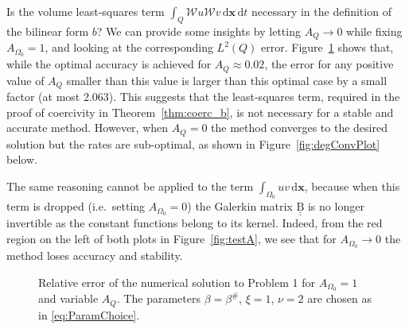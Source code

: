 \documentclass[a4paper]{article}
\theoremstyle{plain}
\theoremstyle{definition}
\newcommand{\operator}[1]{\mathcal{#1}}
\newcommand{\dx}{{\,\mathrm{d}\vect x}}
\newcommand{\dt}{{\,\mathrm{d}t}}
\newcommand{\vect}[1]{\bm{#1}}
\newcommand{\mat}[1]{\underline{\underline{\mathrm{#1}}}}
\newcommand{\oW}{{\operator{W}}}
\newcommand{\OZ}{{\Omega_0}}
\begin{document}
Is the volume least-squares term $\int_Q \oW u \oW v\dx\dt$ necessary in the definition of the bilinear form $b$?
We can provide some insights by letting $A_Q \rightarrow 0$ while fixing $A_\OZ=1$, and looking at the corresponding $L^2(Q)$ error.
Figure~\ref{fig:fixedAs} shows that, while the optimal accuracy is achieved for $A_Q\approx0.02$,
the error for any positive value of $A_Q$ smaller than this value is larger than this optimal case by a small factor (at most 2.063).
This suggests that the least-squares term, required in the proof of coercivity in Theorem~\ref{thm:coerc_b}, is not necessary for a stable and accurate method.
However, when $A_Q = 0$ the method converges to the desired solution but the rates are sub-optimal, as shown in Figure~\ref{fig:degConvPlot} below.

The same reasoning cannot be applied to the term $\int_\OZ uv\dx$, because when this term is dropped (i.e.\ setting $A_\OZ = 0$) the Galerkin matrix $\mat B$ is no longer invertible as the constant functions belong to its kernel.
Indeed, from the red region on the left of both plots in Figure~\ref{fig:testA}, we see that for $A_\OZ\to0$ the method loses accuracy and stability.




\begin{figure}[ht!]
\centering
\caption{Relative error of the numerical solution to Problem 1 for $A_\OZ=1$ and variable $A_Q$.
The parameters $\beta=\beta^\#$, $\xi=1$, $\nu=2$ are chosen as in \eqref{eq:ParamChoice}.
}
\label{fig:fixedAs}
\end{figure}
\end{document}
